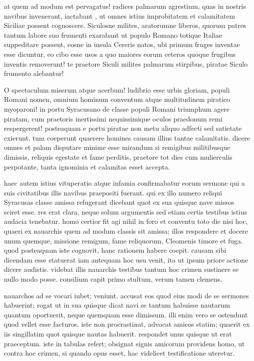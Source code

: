  at quem ad modum est pervagatus! radices palmarum agrestium, quas in nostris navibus invenerant, iactabant , ut omnes istius improbitatem et calamitatem Siciliae possent cognoscere. Siculosne milites, aratorumne liberos, quorum patres tantum labore suo frumenti exarabant ut populo Romano totique Italiae suppeditare possent, eosne in insula Cereris natos, ubi primum fruges inventae esse dicuntur, eo cibo esse usos a quo maiores eorum ceteros quoque frugibus inventis removerunt! te praetore Siculi milites palmarum stirpibus, piratae Siculo frumento alebantur!

 O spectaculum miserum atque acerbum! ludibrio esse urbis gloriam, populi Romani nomen, omnium hominum conventum atque multitudinem piratico myoparoni! in portu Syracusano de classe populi Romani triumphum agere piratam, cum praetoris inertissimi nequissimique oculos praedonum remi respergerent! posteaquam e portu piratae non metu aliquo adfecti sed satietate exierunt, tum coeperunt quaerere homines causam illius tantae calamitatis. dicere omnes et palam disputare minime esse mirandum si remigibus militibusque dimissis, reliquis egestate et fame perditis, praetore tot dies cum mulierculis perpotante, tanta ignominia et calamitas esset accepta.

 haec autem istius vituperatio atque infamia confirmabatur eorum sermone qui a suis civitatibus illis navibus praepositi fuerant. qui ex illo numero reliqui Syracusas classe amissa refugerant dicebant quot ex sua quisque nave missos sciret esse. res erat clara, neque solum argumentis sed etiam certis testibus istius audacia tenebatur. homo certior fit agi nihil in foro et conventu toto die nisi hoc, quaeri ex nauarchis quem ad modum classis sit amissa; illos respondere et docere unum quemque, missione remigum, fame reliquorum, Cleomenis timore et fuga. quod posteaquam iste cognovit, hanc rationem habere coepit. causam sibi dicendam esse statuerat iam antequam hoc usu venit, ita ut ipsum priore actione dicere audistis. videbat illis nauarchis testibus tantum hoc crimen sustinere se nullo modo posse. consilium capit primo stultum, verum tamen clemens.

 nauarchos ad se vocari iubet; veniunt. accusat eos quod eius modi de se sermones habuerint; rogat ut in sua quisque dicat navi se tantum habuisse nautarum quantum oportuerit, neque quemquam esse dimissum. illi enim vero se ostendunt quod vellet esse facturos. iste non procrastinat, advocat amicos statim; quaerit ex iis singillatim quot quisque nautas habuerit. respondet unus quisque ut erat praeceptum. iste in tabulas refert; obsignat signis amicorum providens homo, ut contra hoc crimen, si quando opus esset, hac videlicet testificatione uteretur.

